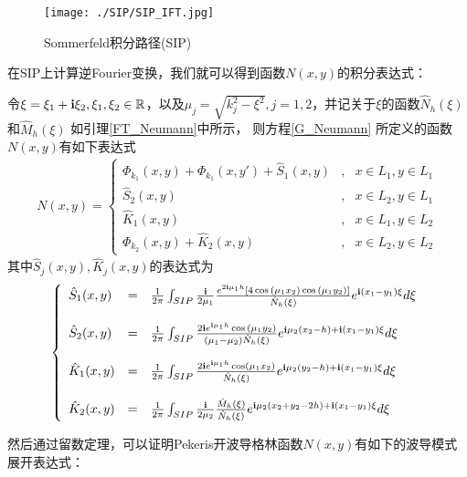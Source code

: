 \begin{figure}[htbp]
  \centering
  \texttt{[image: ./SIP/SIP\_IFT.jpg]}
  \caption{Sommerfeld积分路径(SIP)}\label{SIP_IFT}
\end{figure}
在SIP上计算逆Fourier变换，我们就可以得到函数$N(x,y)$的积分表达式：
\begin{lemma}\label{f_Neumann}
令$\xi=\xi_1+\mathbf{i}\xi_2,\xi_1,\xi_2\in\mathbb{R}$，以及$\mu_j=\sqrt{k_j^2-\xi^2},j=1,2$，并记关于$\xi$的函数$\hat N_h(\xi)$ 和$\hat M_h(\xi)$ 如引理\ref{FT_Neumann}中所示，
则方程\eqref{G_Neumann} 所定义的函数$N(x,y)$有如下表达式
\begin{eqnarray*}
 N(x,y)=\left\{
 \begin{array}{lll}
   \Phi_{k_1}(x,y)+\Phi_{k_1}(x,y')+\hat S_1(x,y)&,&x\in L_1,y\in L_1\\
   \hat S_2(x,y)&,&x\in L_2,y\in L_1\\
   \hat K_1(x,y)&,&x\in L_1,y\in L_2\\
   \Phi_{k_2}(x,y)+\hat K_2(x,y)&,&x\in L_2,y\in L_2
 \end{array}
 \right.
\end{eqnarray*}
其中$\hat S_j(x,y), \hat K_j(x,y)$的表达式为
\begin{eqnarray*}
\left\{
\begin{array}{lll}
 \hat{S}_1(x,y)&=&\frac{1}{2\pi}\int_{SIP}\frac{\mathbf{i}}{2\mu_1}\frac{e^{2\mathbf{i}\mu_1h}
 \left[4\cos{(\mu_1x_2)\cos{(\mu_1y_2)}}\right]}{\hat N_h(\xi)}
  e^{\mathbf{i}(x_1-y_1)\xi}d\xi\\
  & &\\
 \hat{S}_2(x,y)&=&\frac{1}{2\pi}\int_{SIP}\frac{2\mathbf{i} e^{\mathbf{i}\mu_1h}\cos{(\mu_1y_2)}}{(\mu_1-\mu_2)\hat N_h(\xi)}e^{\mathbf{i}\mu_2(x_2-h)+\mathbf{i}(x_1-y_1)\xi}d\xi\\
 & &\\
 \hat{K}_1(x,y)&=&\frac{1}{2\pi}\int_{SIP}\frac{2\mathbf{i} e^{\mathbf{i}\mu_1h}\cos(\mu_1x_2)}{\hat N_h(\xi)}e^{\mathbf{i}\mu_2(y_2-h)+\mathbf{i}(x_1-y_1)\xi}d\xi\\
 & &\\
 \hat{K}_2(x,y)&=&\frac{1}{2\pi}\int_{SIP}\frac{\mathbf{i}}{2\mu_2}\frac{\hat M_h(\xi)}{\hat N_h(\xi)}e^{\mathbf{i}\mu_2(x_2+y_2-2h)+\mathbf{i}(x_1-y_1)\xi}d\xi
\end{array}
\right.
\end{eqnarray*}
\end{lemma}
然后通过留数定理，可以证明Pekeris开波导格林函数$N(x,y)$有如下的波导模式展开表达式：
